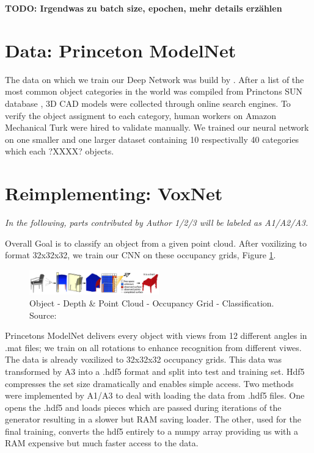 \documentclass[10pt,twocolumn,letterpaper]{article}
\begin{document}
\textbf{TODO: Irgendwas zu batch size, epochen, mehr details erzählen}

\section{Data: Princeton ModelNet}

The data on which we train our Deep Network was build by \cite{shape}. After a list of the most
common object categories in the world was compiled from Princtons SUN database \cite{sun}, 3D CAD models were collected through online 
search engines. To verify the object assigment to each category, human workers on Amazon Mechanical Turk were hired to validate manually. We trained our neural network on one smaller and one larger dataset containing 10 respectivally 40 categories which each ?XXXX? objects.

\section{Reimplementing: VoxNet \cite{maturana_iros_2015}}

\textit{In the following, parts contributed by Author 1/2/3 will be labeled 
as A1/A2/A3.}

Overall Goal is to classify an object from a given point cloud. After voxilizing to format 32x32x32, we train our CNN on these occupancy grids, Figure \ref{fig:algo}.

\begin{figure}[h]
	\label{fig:algo}
	\centering
	\includegraphics[width=0.5\textwidth]{algo}
	\caption{ \newline Object - Depth \& Point Cloud - Occupancy Grid - Classification. Source: \cite{shape}}
\end{figure}

Princetons ModelNet delivers every object with views from 12 different angles in .mat files; we train on all rotations to enhance recognition from 
different viwes. The data is already voxilized to 32x32x32 occupancy grids.
This data was transformed by A3 into a .hdf5 format and split into test and training set. Hdf5 compresses the set size dramatically and enables simple access.
Two methods were implemented by A1/A3 to deal with loading the data from .hdf5 files. One opens the .hdf5 and loads pieces which are passed during iterations of the generator resulting in a slower but RAM saving loader. The other, used for the final training, converts the hdf5 entirely to a numpy array providing us with a RAM expensive but much faster access to the data.
\end{document}
